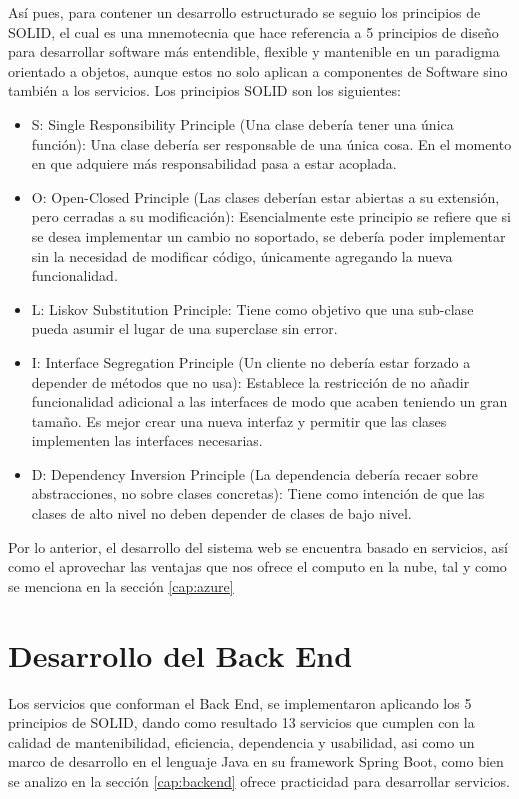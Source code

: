 Así pues, para contener un desarrollo estructurado se seguio los principios de SOLID, el cual es una mnemotecnia que hace referencia a 5 principios de diseño para desarrollar software más entendible, flexible y mantenible en un paradigma orientado a objetos, aunque estos no solo aplican a componentes de Software sino también a los servicios.
\newline
Los principios SOLID son los siguientes: 
\begin{itemize}
	
	\item S: Single Responsibility Principle (Una clase debería tener una única función): Una clase debería ser responsable de una única cosa. En el momento en que adquiere más responsabilidad pasa a estar acoplada. 
 \item  O: Open-Closed Principle (Las clases deberían estar abiertas a su extensión, pero cerradas a su modificación): Esencialmente este principio se refiere que si se desea implementar un cambio no soportado, se debería poder implementar sin la necesidad de modificar código, únicamente agregando la nueva funcionalidad. 
\item  L: Liskov Substitution Principle: Tiene como objetivo que una sub-clase pueda asumir el lugar de una superclase sin error. 
\item  I: Interface Segregation Principle (Un cliente no debería estar forzado a depender de métodos que no usa): Establece la restricción de no añadir funcionalidad adicional a las interfaces de modo que acaben teniendo un gran tamaño. Es mejor crear una nueva interfaz y permitir que las clases implementen las interfaces necesarias. 
\item  D: Dependency Inversion Principle (La dependencia debería recaer sobre abstracciones, no sobre clases concretas): Tiene como intención de que las clases de alto nivel no deben depender de clases de bajo nivel.


\end{itemize}
Por lo anterior, el desarrollo del sistema web se encuentra basado en servicios, así como el aprovechar las ventajas que nos ofrece el computo en la nube, tal y como se menciona en la sección \ref{cap:azure}
    \section{Desarrollo del Back End}
    
Los servicios que conforman el Back End, se implementaron aplicando los 5 principios de SOLID, dando como resultado 13 servicios
que cumplen con la calidad de mantenibilidad, eficiencia, dependencia y usabilidad, asi como un marco de desarrollo en el lenguaje Java en su framework Spring Boot, como bien se analizo en la sección \ref{cap:backend} ofrece practicidad para desarrollar servicios.
\newline

